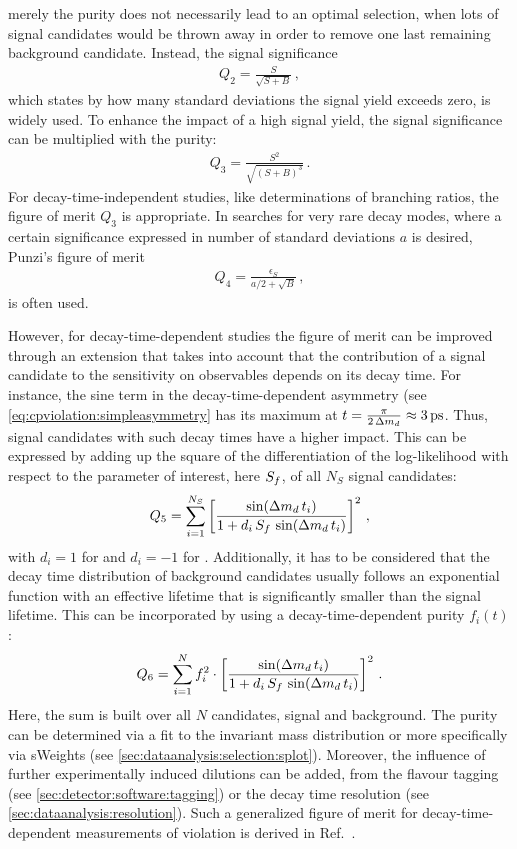 merely the purity does not necessarily lead to an optimal selection, \eg when
lots of signal candidates would be thrown away in order to remove one last
remaining background candidate. Instead, the signal significance
\begin{align}
	Q_2 = \frac{S}{\sqrt{S + B}}\,,
\end{align}
which states by how many standard deviations the signal yield exceeds zero, is
widely used. To enhance the impact of a high signal yield, the signal
significance can be multiplied with the purity:
\begin{align}
	Q_3 = \frac{S^2}{\sqrt{(S + B)^3}}\,.
\end{align}
For decay-time-independent studies, like determinations of branching ratios,
the figure of merit $Q_3$ is appropriate. In searches for very rare decay
modes, where a certain significance expressed in number of standard deviations
$a$ is desired, Punzi's figure of merit~\cite{Punzi:2003bu}
\begin{align}
	Q_4 = \frac{\epsilon_S}{a/2 + \sqrt{B}}\,,
\end{align}
is often used.

However, for decay-time-dependent studies the figure of merit can be improved
through an extension that takes into account that the contribution of a signal
candidate to the sensitivity on \CP observables depends on its decay time. For
instance, the sine term in the decay-time-dependent asymmetry (see
\cref{eq:cpviolation:simpleasymmetry} has its maximum at $t =
\frac{\pi}{2\,\dmd} \approx \SI{3}{\ps}$. Thus, signal candidates with such
decay times have a higher impact. This can be expressed by adding up the
square of the differentiation of the log-likelihood with respect to the
parameter of interest, here $S_{f}$, of all $N_S$ signal candidates:
\begin{align}
	Q_5 = \sum_{i=1}^{N_S} \left[\frac{\sin({\Delta m_{{d}}}\,t_i)}{1 + d_i\,S_f\,\sin({\Delta m_{{d}}}\,t_i)}\right]^2\,,
\end{align}
with $d_i = \num{+1}$ for \Bd and $d_i = \num{-1}$ for \Bdb. Additionally, it
has to be considered that the decay time distribution of background candidates
usually follows an exponential function with an effective lifetime that is
significantly smaller than the \Bd signal lifetime. This can be incorporated
by using a decay-time-dependent purity $f_i(t)$:
\begin{align}
	Q_6 = \sum_{i=1}^{N} f_i^2 \cdot \left[\frac{\sin({\Delta m_{{d}}}\,t_i)}{1 + d_i\,S_f\,\sin({\Delta m_{{d}}}\,t_i)}\right]^2\,.
\end{align}
Here, the sum is built over all $N$ candidates, signal and background. The
purity can be determined via a fit to the invariant mass distribution or more
specifically via sWeights (see \cref{sec:dataanalysis:selection:splot}).
Moreover, the influence of further experimentally induced dilutions can be
added, \eg from the flavour tagging (see \cref{sec:detector:software:tagging})
or the decay time resolution (see \cref{sec:dataanalysis:resolution}). Such a
generalized figure of merit for decay-time-dependent measurements of
\CP violation is derived in Ref.~\cite{FOM}.